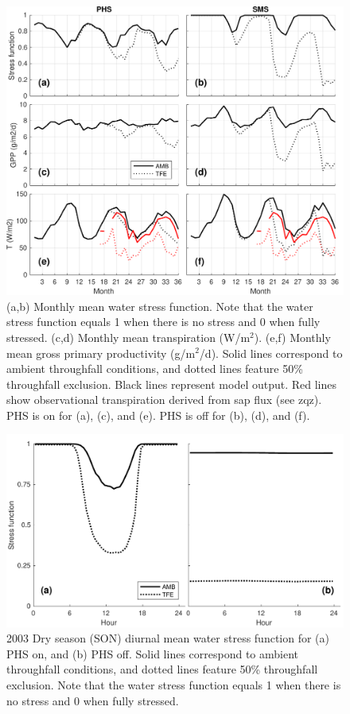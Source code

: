 \documentclass[draft,linenumbers]{agujournal}
\begin{document}
  \clearpage   
  \begin{figure}[h]
     \centering
     \includegraphics[width=30pc]{../figs2/fig3.pdf}
     \caption{(a,b) Monthly mean water stress function. Note that the water stress function equals 1 when there is no stress and 0 when fully stressed.
     (c,d) Monthly mean transpiration (W/m$^2$).
     (e,f) Monthly mean gross primary productivity (g/m$^2$/d). 
     Solid lines correspond to ambient throughfall conditions, and dotted lines feature 50\% throughfall exclusion.
     Black lines represent model output.
     Red lines show observational transpiration derived from sap flux (see zqz).
     PHS is on for (a), (c), and (e). PHS is off for (b), (d), and (f).
     }
     \label{fig:mm}
  \end{figure}
  
          \clearpage
    \begin{figure}[h]
     \centering
     \includegraphics[width=30pc]{../figs2/fig4.pdf}
     \caption{2003 Dry season (SON) diurnal mean water stress function for 
     (a) PHS on, and
     (b) PHS off.
     Solid lines correspond to ambient throughfall conditions, and dotted lines feature 50\% throughfall exclusion.
     Note that the water stress function equals 1 when there is no stress and 0 when fully stressed.
     }
     \label{fig4}
  \end{figure}
  
\end{document}
